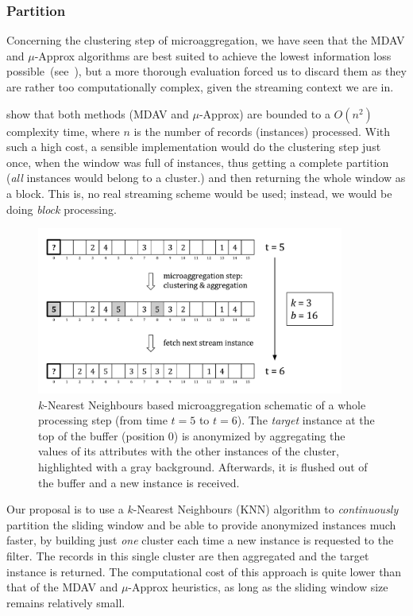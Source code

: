 \subsubsection{Partition}

Concerning the clustering step of microaggregation, we have seen that the MDAV and $\mu$-Approx algorithms are best suited to achieve the lowest information loss possible~(see~), but a more thorough evaluation forced us to discard them as they are rather too computationally complex, given the streaming context we are in.

\citet{Domingo:MuAproxPolyTimeMicroagg} show that both methods (MDAV and $\mu$-Approx) are bounded to a $O(n^2)$ complexity time, where $n$ is the number of records (instances) processed. With such a high cost, a sensible implementation would do the clustering step just once, when the window was full of instances, thus getting a complete partition (\textit{all} instances would belong to a cluster.) and then returning the whole window as a block. This is, no real streaming scheme would be used; instead, we would be doing \textit{block} processing.

\begin{figure}[h]
	\centering
	\includegraphics[width=0.9\textwidth]{figures/microaggregation-schematic-1.pdf}
	\caption[Streaming KNN-based microaggregation.]{$k$-Nearest Neighbours based microaggregation schematic of a whole processing step (from time $t=5$ to $t=6$). The \textit{target} instance at the top of the buffer (position 0) is anonymized by aggregating the values of its attributes with the other instances of the cluster, highlighted with a gray background. Afterwards, it is flushed out of the buffer and a new instance is received.}
	\label{fig:microaggregation-schematic-1}
\end{figure}

Our proposal is to use a $k$-Nearest Neighbours (KNN) algorithm to \textit{continuously} partition the sliding window and be able to provide anonymized instances much faster, by building just \textit{one} cluster each time a new instance is requested to the filter. The records in this single cluster are then aggregated and the target instance is returned. The computational cost of this approach is quite lower than that of the MDAV and $\mu$-Approx heuristics, as long as the sliding window size remains relatively small.

